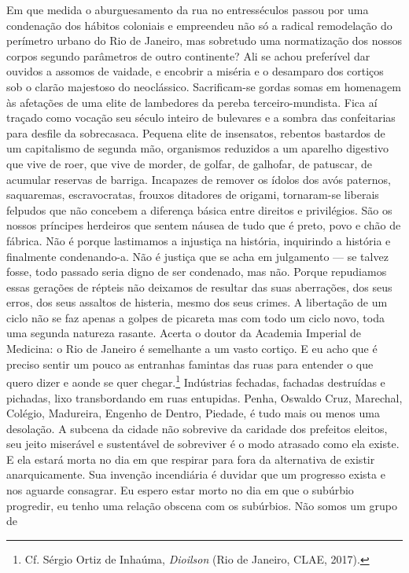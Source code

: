 Em que medida o aburguesamento da rua no entresséculos passou por uma
condenação dos hábitos coloniais e empreendeu não só a radical
remodelação do perímetro urbano do Rio de Janeiro, mas sobretudo uma
normatização dos nossos corpos segundo parâmetros de outro continente?
Ali se achou preferível dar ouvidos a assomos de vaidade, e encobrir a
miséria e o desamparo dos cortiços sob o clarão majestoso do
neoclássico. Sacrificam-se gordas somas em homenagem às afetações de uma
elite de lambedores da pereba terceiro-mundista. Fica aí traçado como
vocação seu século inteiro de bulevares e a sombra das confeitarias para
desfile da sobrecasaca. Pequena elite de insensatos, rebentos bastardos
de um capitalismo de segunda mão, organismos reduzidos a um aparelho
digestivo que vive de roer, que vive de morder, de golfar, de galhofar,
de patuscar, de acumular reservas de barriga. Incapazes de remover os
ídolos dos avós paternos, saquaremas, escravocratas, frouxos ditadores
de origami, tornaram-se liberais felpudos que não concebem a diferença
básica entre direitos e privilégios. São os nossos príncipes herdeiros
que sentem náusea de tudo que é preto, povo e chão de fábrica. Não é
porque lastimamos a injustiça na história, inquirindo a história e
finalmente condenando-a. Não é justiça que se acha em julgamento --- se
talvez fosse, todo passado seria digno de ser condenado, mas não. Porque
repudiamos essas gerações de répteis não deixamos de resultar das suas
aberrações, dos seus erros, dos seus assaltos de histeria, mesmo dos
seus crimes. A libertação de um ciclo não se faz apenas a golpes de
picareta mas com todo um ciclo novo, toda uma segunda natureza rasante.
Acerta o doutor da Academia Imperial de Medicina: o Rio de Janeiro é
semelhante a um vasto cortiço. E eu acho que é preciso sentir um pouco
as entranhas famintas das ruas para entender o que quero dizer e aonde
se quer chegar.\footnote{Cf. Sérgio Ortiz de Inhaúma, \textit{Dioilson}
  (Rio de Janeiro, CLAE, 2017).} Indústrias fechadas, fachadas
destruídas e pichadas, lixo transbordando em ruas entupidas. Penha,
Oswaldo Cruz, Marechal, Colégio, Madureira, Engenho de Dentro, Piedade,
é tudo mais ou menos uma desolação. A subcena da cidade não sobrevive da
caridade dos prefeitos eleitos, seu jeito miserável e sustentável de
sobreviver é o modo atrasado como ela existe. E ela estará morta no dia
em que respirar para fora da alternativa de existir anarquicamente. Sua
invenção incendiária é duvidar que um progresso exista e nos aguarde
consagrar. Eu espero estar morto no dia em que o subúrbio progredir, eu
tenho uma relação obscena com os subúrbios. Não somos um grupo de
